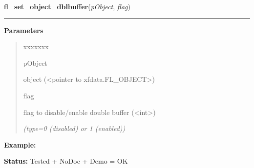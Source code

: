 \hspace{.8\funcindent}\begin{boxedminipage}{\funcwidth}

    \raggedright \textbf{fl\_set\_object\_dblbuffer}(\textit{pObject}, \textit{flag})

    \vspace{-1.5ex}

    \rule{\textwidth}{0.5\fboxrule}
\setlength{\parskip}{2ex}
\setlength{\parskip}{1ex}
      \textbf{Parameters}
      \vspace{-1ex}

      \begin{quote}
        \begin{Ventry}{xxxxxxx}

          \item[pObject]

          object ({\textless}pointer to xfdata.FL\_OBJECT{\textgreater})

          \item[flag]

          flag to disable/enable double buffer 
          ({\textless}int{\textgreater})

            {\it (type=0 (disabled) or 1 (enabled))}

        \end{Ventry}

      \end{quote}

\textbf{Example:} 

\textbf{Status:} Tested + NoDoc + Demo = OK



    \end{boxedminipage}

    \label{xformslib:library:fl_set_object_color}

    \vspace{0.5ex}

